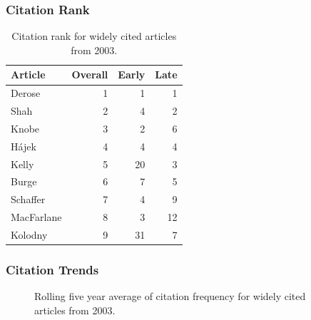 \documentclass[
  10pt,
  letterpaper,
  DIV=11,
  numbers=noendperiod,
  twoside]{scrartcl}
\begin{document}
\subsubsection*{Citation Rank}\label{sec-rank-2003}

\begin{longtable}[]{@{}lrrr@{}}

\caption{\label{tbl-citation-rank-2003}Citation rank for widely cited
articles from 2003.}

\tabularnewline

\toprule\noalign{}
Article & Overall & Early & Late \\
\midrule\noalign{}
\endhead
\bottomrule\noalign{}
\endlastfoot
Derose & 1 & 1 & 1 \\
Shah & 2 & 4 & 2 \\
Knobe & 3 & 2 & 6 \\
Hájek & 4 & 4 & 4 \\
Kelly & 5 & 20 & 3 \\
Burge & 6 & 7 & 5 \\
Schaffer & 7 & 4 & 9 \\
MacFarlane & 8 & 3 & 12 \\
Kolodny & 9 & 31 & 7 \\

\end{longtable}

\subsubsection*{Citation Trends}\label{sec-trends-2003}

\begin{figure}


\caption{\label{fig-citation-spaghetti-2003}Rolling five year average of
citation frequency for widely cited articles from 2003.}

\end{figure}%
\end{document}
